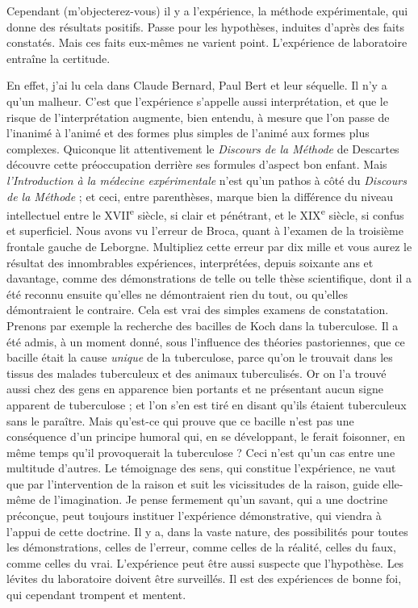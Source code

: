 \documentclass[french,twoside]{book} %
\begin{document}
Cependant (m’objecterez-vous) il y a l’expérience, la méthode expérimentale, qui donne des résultats positifs. Passe pour les hypothèses, induites d’après des faits constatés. Mais ces faits eux-mêmes ne varient point. L’expérience de laboratoire entraîne la certitude.\par
En effet, j’ai lu cela dans Claude Bernard, Paul Bert et leur séquelle. Il n’y a qu’un malheur. C’est que l’expérience s’appelle aussi interprétation, et que le risque de l’interprétation augmente, bien entendu, à mesure que l’on passe de l’inanimé à l’animé et des formes plus simples de l’animé aux formes plus complexes. Quiconque lit attentivement le {\itshape Discours de la Méthode} de Descartes découvre cette préoccupation derrière ses formules d’aspect bon enfant. Mais {\itshape l’Introduction à la médecine expérimentale} n’est qu’un pathos à côté du {\itshape Discours de la Méthode} ; et ceci, entre parenthèses, marque bien la différence du niveau intellectuel entre le XVII\textsuperscript{e} siècle, si clair et pénétrant, et le XIX\textsuperscript{e} siècle, si confus et superficiel. Nous avons vu l’erreur de Broca, quant à l’examen de la troisième frontale gauche de Leborgne. Multipliez cette erreur par dix mille et vous aurez le résultat des innombrables expériences, interprétées, depuis soixante ans et davantage, comme des démonstrations de telle ou telle thèse scientifique, dont il a été reconnu ensuite qu’elles ne démontraient rien du tout, ou qu’elles démontraient le contraire. Cela est vrai des simples examens de constatation. Prenons par exemple la recherche des bacilles de Koch dans la tuberculose. Il a été admis, à un moment donné, sous l’influence des théories pastoriennes, que ce bacille était la cause {\itshape unique} de la tuberculose, parce qu’on le trouvait dans les tissus des malades tuberculeux et des animaux tuberculisés. Or on l’a trouvé aussi chez des gens en apparence bien portants et ne présentant aucun signe apparent de tuberculose ; et l’on s’en est tiré en disant qu’ils étaient tuberculeux sans le paraître. Mais qu’est-ce qui prouve que ce bacille n’est pas une conséquence d’un principe humoral qui, en se développant, le ferait foisonner, en même temps qu’il provoquerait la tuberculose ? Ceci n’est qu’un cas entre une multitude d’autres. Le témoignage des sens, qui constitue l’expérience, ne vaut que par l’intervention de la raison et suit les vicissitudes de la raison, guide elle-même de l’imagination. Je pense fermement qu’un savant, qui a une doctrine préconçue, peut toujours instituer l’expérience démonstrative, qui viendra à l’appui de cette doctrine. Il y a, dans la vaste nature, des possibilités pour toutes les démonstrations, celles de l’erreur, comme celles de la réalité, celles du faux, comme celles du vrai. L’expérience peut être aussi suspecte que l’hypothèse. Les lévites du laboratoire doivent être surveillés. Il est des expériences de bonne foi, qui cependant trompent et mentent.\par
\end{document}

